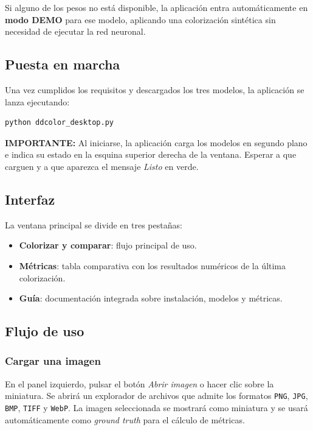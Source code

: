 \documentclass[a4paper]{article}
\begin{document}
Si alguno de los pesos no está disponible, la aplicación entra automáticamente en \textbf{modo DEMO} para ese modelo, aplicando una colorización sintética sin necesidad de ejecutar la red neuronal.

\subsection{Puesta en marcha}

Una vez cumplidos los requisitos y descargados los tres modelos, la aplicación se lanza ejecutando:

\begin{verbatim}
python ddcolor_desktop.py
\end{verbatim}

\textbf{IMPORTANTE:} Al iniciarse, la aplicación carga los modelos en segundo plano e indica su estado en la esquina superior derecha de la ventana. Esperar a que carguen y a que aparezca el mensaje \textit{Listo} en verde.

\subsection{Interfaz}

La ventana principal se divide en tres pestañas:

\begin{itemize}
  \item \textbf{Colorizar y comparar}: flujo principal de uso.
  \item \textbf{Métricas}: tabla comparativa con los resultados numéricos de la última colorización.
  \item \textbf{Guía}: documentación integrada sobre instalación, modelos y métricas.
\end{itemize}

\subsection{Flujo de uso}

\subsubsection{Cargar una imagen}

En el panel izquierdo, pulsar el botón \textit{Abrir imagen} o hacer clic sobre la miniatura. Se abrirá un explorador de archivos que admite los formatos \texttt{PNG}, \texttt{JPG}, \texttt{BMP}, \texttt{TIFF} y \texttt{WebP}. La imagen seleccionada se mostrará como miniatura y se usará automáticamente como \textit{ground truth} para el cálculo de métricas.
\end{document}
